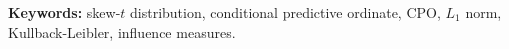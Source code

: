\documentclass[12pt,twoside,a4paper]{book}
\renewcommand{\chaptermark}[1]{\markboth{\MakeUppercase{#1}}{}}
\begin{document}
\noindent \textbf{Keywords:} skew-$t$ distribution, conditional predictive ordinate, CPO, $L_1$ norm, Kullback-Leibler, influence measures.

\tableofcontents    %


\listoffigures            
\listoftables            

\mainmatter

\fancyhead[RE,LO]{\thesection}

\singlespacing              %


\renewcommand{\chaptermark}[1]{\markboth{\MakeUppercase{\appendixname\ \thechapter}} {\MakeUppercase{#1}} }
\fancyhead[RE,LO]{}
\appendix


\backmatter \singlespacing   %
\end{document}
